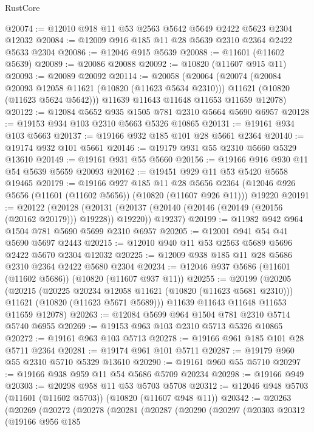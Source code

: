 \begin{lexlean}{RustCore}
\begin{coremodule}
@20074 := @12010 @918 @11 @53 @2563 @5642 @5649 @2422 @5623 @2304 @12032
@20084 := @12009 @916 @185 @11 @28 @5639 @2310 @2364 @2422 @5633 @2304
@20086 := @12046 @915 @5639
@20088 := @11601 (@11602 @5639)
@20089 := @20086 @20088
@20092 := @10820 (@11607 @915 @11)
@20093 := @20089 @20092
@20114 := @20058
    (@20064
      (@20074
        (@20084 @20093 @12058 @11621 (@10820 (@11623 @5634 @2310)))
        @11621
        (@10820 (@11623 @5624 @5642)))
      @11639
      @11643
      @11648
      @11653
      @11659
      @12078)
@20122 := @12084 @5652 @935 @1505 @781 @2310 @5664 @5690 @6957
@20128 := @19153 @934 @103 @2310 @5663 @5326 @10865
@20131 := @19161 @934 @103 @5663
@20137 := @19166 @932 @185 @101 @28 @5661 @2364
@20140 := @19174 @932 @101 @5661
@20146 := @19179 @931 @55 @2310 @5660 @5329 @13610
@20149 := @19161 @931 @55 @5660
@20156 := @19166 @916 @930 @11 @54 @5639 @5659 @20093
@20162 := @19451 @929 @11 @53 @5420 @5658 @19465
@20179 := @19166
    @927
    @185
    @11
    @28
    @5656
    @2364
    (@12046 @926 @5656 (@11601 (@11602 @5656)) (@10820 (@11607 @926 @11)))
    @19220
@20191 := @20122
    (@20128
      (@20131 (@20137 (@20140 (@20146 (@20149 (@20156 (@20162 @20179))) @19228)) @19220))
      @19237)
@20199 := @11982 @942 @964 @1504 @781 @5690 @5699 @2310 @6957
@20205 := @12001 @941 @54 @41 @5690 @5697 @2443
@20215 := @12010 @940 @11 @53 @2563 @5689 @5696 @2422 @5670 @2304 @12032
@20225 := @12009 @938 @185 @11 @28 @5686 @2310 @2364 @2422 @5680 @2304
@20234 := @12046 @937 @5686 (@11601 (@11602 @5686)) (@10820 (@11607 @937 @11))
@20255 := @20199
    (@20205
      (@20215
        (@20225 @20234 @12058 @11621 (@10820 (@11623 @5681 @2310)))
        @11621
        (@10820 (@11623 @5671 @5689)))
      @11639
      @11643
      @11648
      @11653
      @11659
      @12078)
@20263 := @12084 @5699 @964 @1504 @781 @2310 @5714 @5740 @6955
@20269 := @19153 @963 @103 @2310 @5713 @5326 @10865
@20272 := @19161 @963 @103 @5713
@20278 := @19166 @961 @185 @101 @28 @5711 @2364
@20281 := @19174 @961 @101 @5711
@20287 := @19179 @960 @55 @2310 @5710 @5329 @13610
@20290 := @19161 @960 @55 @5710
@20297 := @19166 @938 @959 @11 @54 @5686 @5709 @20234
@20298 := @19166 @949
@20303 := @20298 @958 @11 @53 @5703 @5708
@20312 := @12046 @948 @5703 (@11601 (@11602 @5703)) (@10820 (@11607 @948 @11))
@20342 := @20263
    (@20269
      (@20272
        (@20278
          (@20281
            (@20287
              (@20290
                (@20297
                  (@20303
                    @20312
                    (@19166
                      @956
                      @185

\end{coremodule}
\end{lexlean}
